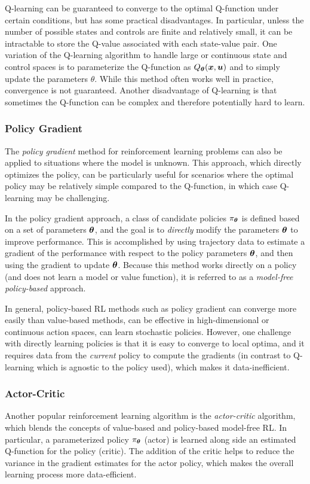 Q-learning can be guaranteed to converge to the optimal Q-function under certain conditions, but has some practical disadvantages. In particular, unless the number of possible states and controls are finite and relatively small, it can be intractable to store the Q-value associated with each state-value pair. One variation of the Q-learning algorithm to handle large or continuous state  and control spaces is to parameterize the Q-function as $Q_{\bm{\theta}}(\bm{x}, \bm{u})$ and to simply update the parameters $\theta$. While this method often works well in practice, convergence is not guaranteed. Another disadvantage of Q-learning is that sometimes the Q-function can be complex and therefore potentially hard to learn.

\subsubsection{Policy Gradient}
The \textit{policy gradient} method for reinforcement learning problems can also be applied to situations where the model is unknown. This approach, which directly optimizes the policy, can be particularly useful for scenarios where the optimal policy may be relatively simple compared to the Q-function, in which case Q-learning may be challenging. 

In the policy gradient approach, a class of candidate policies $\pi_{\bm{\theta}}$ is defined based on a set of parameters $\bm{\theta}$, and the goal is to \textit{directly} modify the parameters $\bm{\theta}$ to improve performance. This is accomplished by using trajectory data to estimate a gradient of the performance with respect to the policy parameters $\bm{\theta}$, and then using the gradient to update $\bm{\theta}$. Because this method works directly on a policy (and does not learn a model or value function), it is referred to as a \textit{model-free} \textit{policy-based} approach.

In general, policy-based RL methods such as policy gradient can converge more easily than value-based methods, can be effective in high-dimensional or continuous action spaces, can learn stochastic policies. However, one challenge with directly learning policies is that it is easy to converge to local optima, and it requires data from the \textit{current} policy to compute the gradients (in contrast to Q-learning which is agnostic to the policy used), which makes it data-inefficient.

\subsubsection{Actor-Critic}
Another popular reinforcement learning algorithm is the \textit{actor-critic} algorithm, which blends the concepts of value-based and policy-based model-free RL. In particular, a parameterized policy $\pi_{\bm{\theta}}$ (actor) is learned  along side an estimated Q-function for the policy (critic). The addition of the critic helps to reduce the variance in the gradient estimates for the actor policy, which makes the overall learning process more data-efficient.

